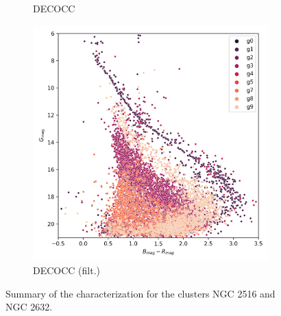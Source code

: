 \documentclass[11pt,a4paper,english,twocolumn]{article}
\begin{document}
\begin{figure}[!hbt]
\begin{subfigure}{0.3\textwidth}
    \caption{DECOCC}
  \end{subfigure}%
  \begin{subfigure}{0.3\textwidth}
    \includegraphics[width=\textwidth]{../figures/ngc_2632/dec_hr_diagram_filtered_ngc_2632.png}
    \caption{DECOCC (filt.)}
  \end{subfigure}
  \caption{Summary of the characterization for the clusters NGC 2516 and NGC 2632.}
  \label{fig:ngc_2516_ngc_2632_characterization_evolution}
\end{figure}
\end{document}
